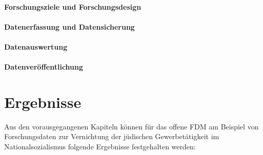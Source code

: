 \paragraph{Forschungsziele und Forschungsdesign}
\paragraph{Datenerfassung und Datensicherung}
\paragraph{Datenauswertung}
\paragraph{Datenveröffentlichung}

\section{Ergebnisse}
 
Aus den vorausgegangenen Kapiteln können für das offene FDM am Beispiel von Forschungsdaten zur Vernichtung der jüdischen Gewerbetätigkeit im Nationalsozialismus folgende Ergebnisse festgehalten werden:

